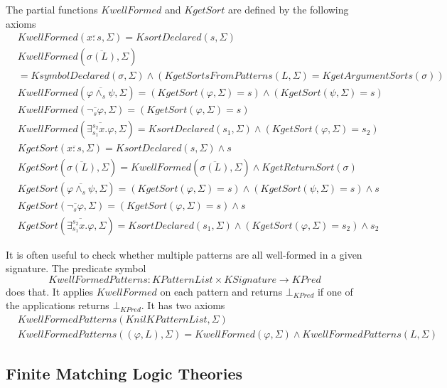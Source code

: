 \documentclass[UTF8,11pt]{article}
\theoremstyle{plain}
\theoremstyle{definition}
\theoremstyle{remark}
\newcommand{\cln}{{:}}
\newcommand{\KPred}{\mathit{KPred}}
\newcommand{\KgetArgumentSorts}{\mathit{KgetArgumentSorts}}
\newcommand{\KgetReturnSort}{\mathit{KgetReturnSort}}
\newcommand{\KPatternList}{\mathit{KPatternList}}
\newcommand{\KnilKPatternList}{\mathit{KnilKPatternList}}
\newcommand{\KSignature}{\mathit{KSignature}}
\newcommand{\KsortDeclared}{\mathit{KsortDeclared}}
\newcommand{\KsymbolDeclared}{\mathit{KsymbolDeclared}}
\newcommand{\KwellFormed}{\mathit{KwellFormed}}
\newcommand{\KwellFormedPatterns}{\mathit{KwellFormedPatterns}}
\newcommand{\KgetSort}{\mathit{KgetSort}}
\newcommand{\KgetSortsFromPatterns}{\mathit{KgetSortsFromPatterns}}
\begin{document}
The partial functions $\KwellFormed$ and $\KgetSort$ are defined by the following axioms
\begin{align*}
  &\KwellFormed(\overline{x \cln s}, \Sigma) = \KsortDeclared(s, \Sigma)
  \\
  & \KwellFormed(\overline{\sigma(L)}, \Sigma) 
  \\
  & = \KsymbolDeclared(\sigma, \Sigma) \wedge (\KgetSortsFromPatterns(L, \Sigma) = \KgetArgumentSorts(\sigma))
  \\
  & \KwellFormed(\overline{\varphi \wedge_s \psi}, \Sigma) = (\KgetSort(\varphi, \Sigma) = s) \wedge (\KgetSort(\psi, \Sigma) = s)
  \\
  & \KwellFormed(\overline{\neg_s \varphi}, \Sigma) = (\KgetSort(\varphi, \Sigma) = s)
  \\
  & \KwellFormed(\overline{\exists_{s_1}^{s_2} x . \varphi}, \Sigma) = \KsortDeclared(s_1, \Sigma) \wedge (\KgetSort(\varphi, \Sigma) = s_2)
  \\
  & \KgetSort(\overline{x \cln s}, \Sigma) = \KsortDeclared(s, \Sigma) \wedge s
  \\
  & \KgetSort(\overline{\sigma(L)}, \Sigma) = \KwellFormed(\overline{\sigma(L)}, \Sigma) \wedge \KgetReturnSort(\sigma)
  \\
  & \KgetSort(\overline{\varphi \wedge_s \psi}, \Sigma) = (\KgetSort(\varphi, \Sigma) = s) \wedge (\KgetSort(\psi, \Sigma) = s) \wedge s
  \\
  & \KgetSort(\overline{\neg_s \varphi}, \Sigma) = (\KgetSort(\varphi, \Sigma) = s) \wedge s
  \\
  & \KgetSort(\overline{\exists_{s_1}^{s_2} x . \varphi}, \Sigma) = \KsortDeclared(s_1, \Sigma) \wedge (\KgetSort(\varphi, \Sigma) = s_2) \wedge s_2
\end{align*}

It is often useful to check whether multiple patterns are all well-formed in a given signature.
The predicate symbol
$$ \KwellFormedPatterns \colon \KPatternList \times \KSignature \to \KPred$$
does that.
It applies $\KwellFormed$ on each pattern and returns $\bot_\KPred$ if one of the applications returns $\bot_\KPred$.
It has two axioms
\begin{align*}
 & \KwellFormedPatterns(\KnilKPatternList, \Sigma) \\
 & \KwellFormedPatterns((\varphi, L), \Sigma) = \KwellFormed(\varphi, \Sigma) \wedge \KwellFormedPatterns(L, \Sigma)
\end{align*}

\subsection{Finite Matching Logic Theories}
\end{document}
